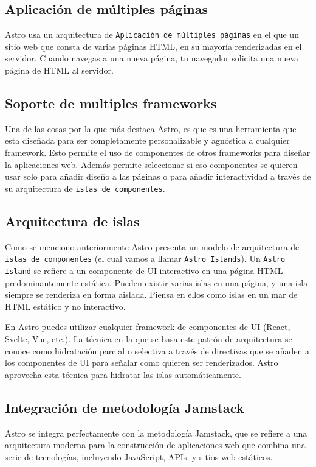 \subsection{Aplicación de múltiples páginas}
Astro usa un arquitectura de \verb|Aplicación de múltiples páginas|\cite{multipage} en el que un sitio web que consta de varias páginas HTML, en su mayoría renderizadas en el servidor. Cuando navegas a una nueva página, tu navegador solicita una nueva página de HTML al servidor.

\subsection{Soporte de multiples frameworks}
Una de las cosas por la que más destaca Astro, es que es una herramienta que esta diseñada para ser completamente personalizable y agnóstica a cualquier framework. Esto permite el uso de componentes de otros frameworks para diseñar la aplicaciones web. Además permite seleccionar si eso componentes se quieren usar solo para añadir diseño a las páginas o para añadir interactividad a través de su arquitectura de \verb|islas de componentes|\cite{islas}.

\subsection{Arquitectura de islas}
Como se menciono anteriormente Astro presenta un modelo de arquitectura de \verb|islas de componentes|\cite{islas} (el cual vamos a llamar \verb|Astro Islands|). Un \verb|Astro Island| se refiere a un componente de UI interactivo en una página HTML predominantemente estática. Pueden existir varias islas en una página, y una isla siempre se renderiza en forma aislada. Piensa en ellos como islas en un mar de HTML estático y no interactivo.

En Astro puedes utilizar cualquier framework de componentes de UI (React, Svelte, Vue, etc.). La técnica en la que se basa este patrón de arquitectura se conoce como hidratación parcial o selectiva a través de directivas que se añaden a los componentes de UI para señalar como quieren ser renderizados. Astro aprovecha esta técnica para hidratar las islas automáticamente.

\subsection{Integración de metodología Jamstack}
Astro se integra perfectamente con la metodología Jamstack, que se refiere a una arquitectura moderna para la construcción de aplicaciones web que combina una serie de tecnologías, incluyendo JavaScript, APIs, y sitios web estáticos.

